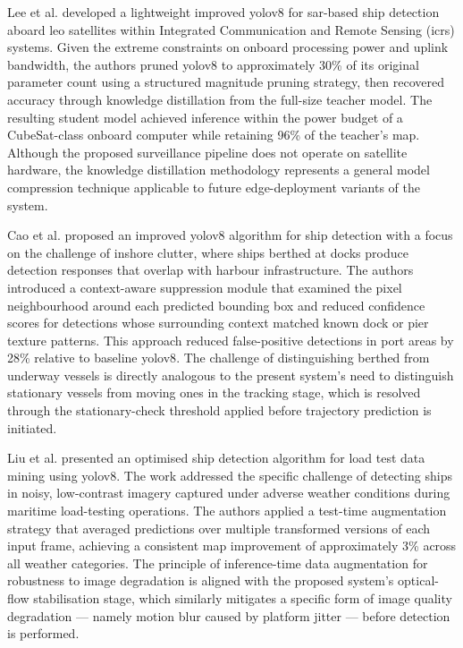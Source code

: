 Lee et al. \cite{Lee2025} developed a lightweight improved \gls{yolov8} for \gls{sar}-based
ship detection aboard \gls{leo} satellites within Integrated
Communication and Remote Sensing (\gls{icrs}) systems. Given the extreme constraints
on onboard processing power and uplink bandwidth, the authors pruned \gls{yolov8}
to approximately 30\% of its original parameter count using a structured magnitude
pruning strategy, then recovered accuracy through knowledge distillation from the
full-size teacher model. The resulting student model achieved inference within
the power budget of a CubeSat-class onboard computer while retaining 96\% of
the teacher's \gls{map}. Although the proposed surveillance pipeline does not operate
on satellite hardware, the knowledge distillation methodology represents a
general model compression technique applicable to future edge-deployment variants
of the system.
 
Cao et al. \cite{Cao2024} proposed an improved \gls{yolov8} algorithm for ship
detection with a focus on the challenge of inshore clutter, where ships berthed
at docks produce detection responses that overlap with harbour infrastructure.
The authors introduced a context-aware suppression module that examined the pixel
neighbourhood around each predicted bounding box and reduced confidence scores
for detections whose surrounding context matched known dock or pier texture
patterns. This approach reduced false-positive detections in port areas by 28\%
relative to baseline \gls{yolov8}. The challenge of distinguishing berthed from underway
vessels is directly analogous to the present system's need to distinguish
stationary vessels from moving ones in the tracking stage, which is resolved through
the stationary-check threshold applied before trajectory prediction is initiated.
 
Liu et al. \cite{Liu2025a} presented an optimised ship detection algorithm
for load test data mining using \gls{yolov8}. The work addressed the specific challenge
of detecting ships in noisy, low-contrast imagery captured under adverse weather
conditions during maritime load-testing operations. The authors applied a test-time
augmentation strategy that averaged predictions over multiple transformed versions
of each input frame, achieving a consistent \gls{map} improvement of approximately 3\%
across all weather categories. The principle of inference-time data augmentation
for robustness to image degradation is aligned with the proposed system's
optical-flow stabilisation stage, which similarly mitigates a specific form of
image quality degradation --- namely motion blur caused by platform jitter ---
before detection is performed.
 
